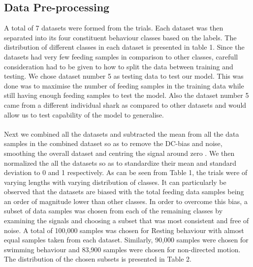 \documentclass[conference]{IEEEtran}
\begin{document}

\subsection{Data Pre-processing}
A total of 7 datasets were formed from the trials. Each dataset was then separated into its four constituent behaviour classes based on the labels. The distribution of different classes in each dataset is presented in table 1. Since the datasets had very few feeding samples in comparison to other classes, carefull consideration had to be given to how to split the data between training and testing. We chose dataset number 5 as testing data to test our model. This was done was to maximise the number of feeding samples in the training data while still having enough feeding samples to test the model. Also the dataset number 5 came from a different individual shark as compared to other datasets and would allow us to test capability of the model to generalise. \\
\\
Next we combined all the datasets and subtracted the mean from all the data samples in the combined dataset so as to remove the DC-bias and noise, smoothing the overall dataset and centring the signal around zero \cite{14}. We then normalized the all the datasets so as to standardize their mean and standard deviation to 0 and 1 respectively. 
As can be seen from Table 1, the trials were of varying lengths with varying distribution of classes. It can particularly be observed that the datasets are biased with the total feeding data samples being an order of magnitude lower than other classes. In order to overcome this bias, a subset of data samples was chosen from each of the remaining classes by examining the signals and choosing a subset that was most consistent and free of noise. A total of 100,000 samples was chosen for Resting behaviour with almost equal samples taken from each dataset. Similarly, 90,000 samples were chosen for swimming behaviour and 83,900 samples were chosen for non-directed motion. The distribution of the chosen subsets is presented in Table 2.

\end{document}
